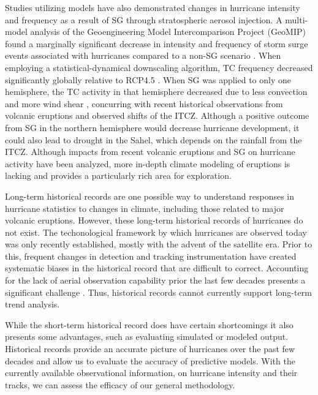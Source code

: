 Studies utilizing models have
also demonstrated changes in hurricane intensity and frequency as a
result of SG through stratospheric aerosol injection. A multi-model
analysis of the Geoengineering Model Intercomparison Project (GeoMIP)
found a marginally significant decrease in intensity and frequency of
storm surge events associated with hurricanes compared to a non-SG
scenario \cite{atl_surge}. When employing a statistical-dynamical
downscaling algorithm, TC frequency decreased significantly globally
relative to RCP4.5 \cite{solar_geo}.  When SG was applied to only one
hemisphere, the TC activity in that hemisphere decreased due to less
convection and more wind shear \cite{solar_geo}, concurring with
recent historical observations from volcanic eruptions and observed
shifts of the ITCZ. Although a positive outcome from SG in the
northern hemisphere would decrease hurricane development, it could
also lead to drought in the Sahel, which depends on the rainfall from
the ITCZ.  Although impacts from recent volcanic eruptions and SG on
hurricane activity have been analyzed, more in-depth climate modeling
of eruptions is lacking and provides a particularly rich area for
exploration.
\par
Long-term historical records are one possible way to understand responses in hurricane statistics to changes in climate, including those related to major volcanic eruptions. However, these long-term historical records of hurricanes do not exist. The techonological framework by which hurricanes are observed today was only recently established, mostly with the advent of the satellite era. Prior to this, frequent changes in detection and tracking instrumentation have created systematic biases in the historical record that are difficult to correct. Accounting for the lack of aerial observation capability prior the last few decades presents a significant challenge \cite{kerry_clivar}. Thus, historical records cannot currently support long-term trend analysis. 
\par
While the short-term historical record does have certain shortcomings it also presents some advantages, such as evaluating simulated or modeled output. Historical records provide an accurate picture of hurricanes over the past few decades and allow us to evaluate the accuracy of predictive models. With the currently available observational information, on hurricane intensity and their tracks, we can assess the efficacy of our general methodology.
\par
